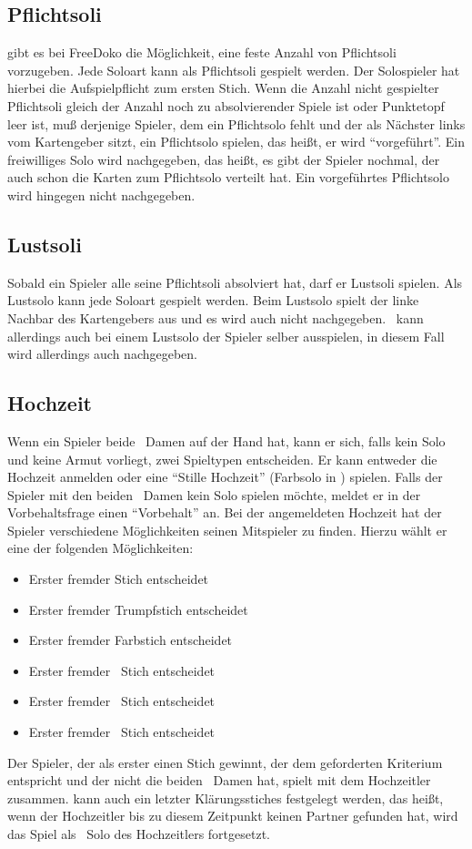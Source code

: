 \documentclass{scrartcl}
\begin{document}
\subsection{Pflichtsoli}
\Optional gibt es bei FreeDoko die Möglichkeit, eine feste Anzahl von Pflichtsoli vorzugeben. Jede Soloart kann als Pflichtsoli gespielt werden. Der Solospieler hat hierbei die Aufspielpflicht zum ersten Stich. Wenn die Anzahl nicht gespielter Pflichtsoli gleich der Anzahl noch zu absolvierender Spiele ist oder Punktetopf leer ist, muß derjenige Spieler, dem ein Pflichtsolo fehlt und der als Nächster links vom Kartengeber sitzt, ein Pflichtsolo spielen, das heißt, er wird "`vorgeführt"'. Ein freiwilliges Solo wird nachgegeben, das heißt, es gibt der Spieler nochmal, der auch schon die Karten zum Pflichtsolo verteilt hat. Ein vorgeführtes Pflichtsolo wird hingegen nicht nachgegeben.

\subsection{Lustsoli}
Sobald ein Spieler alle seine Pflichtsoli absolviert hat, darf er Lustsoli spielen. Als Lustsolo kann jede Soloart gespielt werden.  Beim Lustsolo spielt der linke Nachbar des Kartengebers aus und es wird auch nicht nachgegeben. \Optional \ kann allerdings auch bei einem Lustsolo der Spieler selber ausspielen, in diesem Fall wird allerdings auch nachgegeben.

\subsection{Hochzeit}
Wenn ein Spieler beide \Kreuz\ Damen auf der Hand hat, kann er sich, falls kein Solo und keine Armut vorliegt, zwei Spieltypen entscheiden. Er kann entweder die Hochzeit anmelden oder eine "`Stille Hochzeit"' (Farbsolo in \Karo) spielen. Falls der Spieler mit den beiden \Kreuz\ Damen kein Solo spielen möchte, meldet er in der Vorbehaltsfrage einen "`Vorbehalt"' an. Bei der angemeldeten Hochzeit hat der Spieler verschiedene Möglichkeiten seinen Mitspieler zu finden. Hierzu wählt er eine der folgenden Möglichkeiten:
\begin{itemize}
  \item Erster fremder Stich entscheidet
  \item Erster fremder Trumpfstich entscheidet
  \item Erster fremder Farbstich entscheidet
  \item Erster fremder \Herz\ Stich entscheidet
  \item Erster fremder \Pik\ Stich entscheidet
  \item Erster fremder \Kreuz\ Stich entscheidet
\end{itemize}
Der Spieler, der als erster einen Stich gewinnt, der dem geforderten Kriterium entspricht und der nicht die beiden \Kreuz\ Damen hat, spielt mit dem Hochzeitler zusammen. \Optional kann auch ein letzter Klärungsstiches festgelegt werden, das heißt, wenn der Hochzeitler bis zu diesem Zeitpunkt keinen Partner gefunden hat, wird das Spiel als \Karo\ Solo des Hochzeitlers
fortgesetzt.
\end{document}
